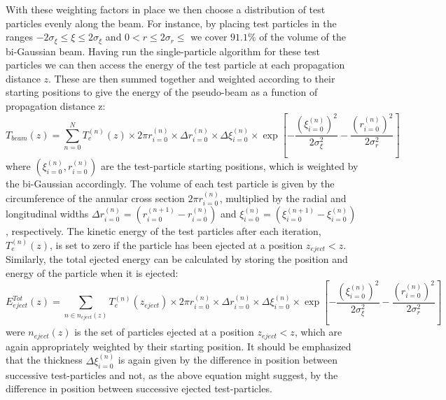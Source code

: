 With these weighting factors in place we then choose a distribution of test particles evenly along the beam. For instance, by placing test particles in the ranges $-2\sigma_{\xi}\leq\xi\leq 2\sigma_{\xi}$ and $0<r\leq2\sigma_r\leq$ we cover $91.1\%$ of the volume of the bi-Gaussian beam. Having run the single-particle algorithm for these test particles we can then access the energy of the test particle at each propagation distance $z$. These are then summed together and weighted according to their starting positions to give the energy of the pseudo-beam as a function of propagation distance z:
\begin{equation}
T_{beam}(z)= \sum_{n=0}^N T_e^{(n)}(z)\times 2\pi r_{i=0}^{(n)}\times\Delta r_{i=0}^{(n)}\times\Delta \xi_{i=0}^{(n)}\times\exp[-\frac{\left(\xi_{i=0}^{(n)}\right)^2}{2\sigma_{\xi}^2}-\frac{\left(r_{i=0}^{(n)}\right)^2}{2\sigma_{r}^2}]
\end{equation}
where $(\xi_{i=0}^{(n)},r_{i=0}^{(n)})$ are the test-particle starting positions, which is weighted by the bi-Gaussian accordingly. The volume of each test particle is given by the circumference of the annular cross section $2\pi r_{i=0}^{(n)}$, multiplied by the radial and longitudinal widths $\Delta r_{i=0}^{(n)}=( r_{i=0}^{(n+1)}-r_{i=0}^{(n)})$ and $\xi_{i=0}^{(n)}=( \xi_{i=0}^{(n+1)}-\xi_{i=0}^{(n)})$, respectively. The kinetic energy of the test particles after each iteration, $T_e^{(n)}(z)$, is set to zero if the particle has been ejected at a position $z_{eject}<z$. Similarly, the total ejected energy can be calculated by storing the position and energy of the particle when it is ejected:
\begin{equation}
E^{Tot}_{eject}(z)=\sum_{n\in n_{eject}(z)} T_e^{(n)}(z_{eject})\times 2\pi r_{i=0}^{(n)}\times\Delta r_{i=0}^{(n)}\times\Delta \xi_{i=0}^{(n)}\times\exp[-\frac{\left(\xi_{i=0}^{(n)}\right)^2}{2\sigma_{\xi}^2}-\frac{\left(r_{i=0}^{(n)}\right)^2}{2\sigma_{r}^2}]
\end{equation}
were $n_{eject}(z)$ is the set of particles ejected at a position $z_{eject}<z$, which are again appropriately weighted by their starting position. It should be emphasized that the thickness $\Delta \xi_{i=0}^{(n)}$ is again given by the difference in position between successive test-particles and not, as the above equation might suggest, by the difference in position between successive ejected test-particles. \\
